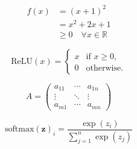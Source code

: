 \documentclass[border=10pt]{standalone}
\begin{document}
\begin{minipage}{0.8\textwidth}
\begin{align*}
  f(x) &= (x + 1)^2 \\
       &= x^2 + 2x + 1 \\
       &\geq 0 \quad \forall x \in \mathbb{R}
\end{align*}

\begin{equation*}
  \mathrm{ReLU}(x) = \begin{cases}
    x  & \text{if } x \geq 0, \\
    0  & \text{otherwise}.
  \end{cases}
\end{equation*}

\begin{equation*}
  A = \begin{pmatrix}
    a_{11} & \cdots & a_{1n} \\
    \vdots & \ddots & \vdots \\
    a_{m1} & \cdots & a_{mn}
  \end{pmatrix}
\end{equation*}

\begin{equation*}
  \mathrm{softmax}(\bm{z})_i
    = \frac{\exp(z_i)}{\sum_{j=1}^{n} \exp(z_j)}
\end{equation*}
\end{minipage}
\end{document}
